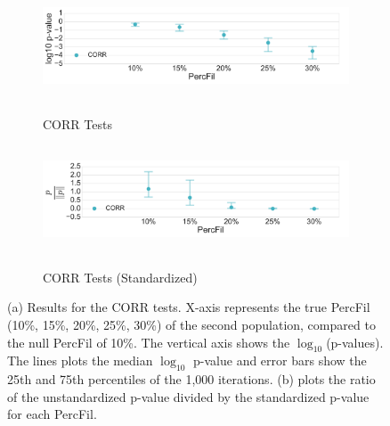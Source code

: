 \documentclass[12pt]{article}
\begin{document}
\begin{figure}[htp!]
  \centering
  \begin{subfigure}{.75\textwidth}
    \caption{CORR Tests}
    \includegraphics[height = 1.25in]{figure_8_correlation_group.pdf}
    \label{fig:sub_corr}
  \end{subfigure}
  \begin{subfigure}{.75\textwidth}
    \caption{CORR Tests (Standardized)}
    \includegraphics[height = 1.25in]{figure_8_joint_correlation_group.pdf}
    \label{fig:sub_corr_normed}
  \end{subfigure}
\caption{(a) Results for the CORR tests. X-axis represents the true PercFil (10\%, 15\%, 20\%, 25\%, 30\%) of the second population, compared to the null PercFil of 10\%. The vertical axis shows the $\log_{10}$(p-values). The lines plots the median $\log_{10}$ p-value and error bars show the 25th and 75th percentiles of the 1,000 iterations. (b) plots the ratio of the unstandardized p-value divided by the standardized p-value for each PercFil. }
\label{fig:sub_corr_results_2}
\end{figure}
\end{document}
